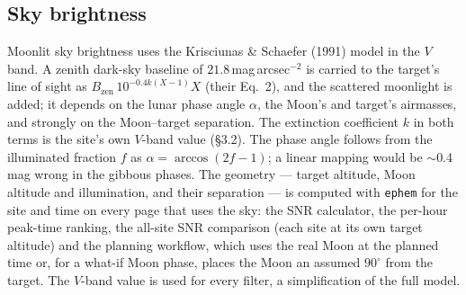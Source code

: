 \documentclass[11pt]{article}
\begin{document}
\subsection{Sky brightness}
\label{sec:sky}
Moonlit sky brightness uses the Krisciunas \& Schaefer (1991) model \cite{ks1991}
in the $V$ band. A zenith dark-sky baseline of $21.8$\,mag\,arcsec$^{-2}$ is carried
to the target's line of sight as $B_{\text{zen}}\,10^{-0.4k(X-1)}X$ (their Eq.~2),
and the scattered moonlight is added; it depends on the lunar phase angle $\alpha$,
the Moon's and target's airmasses, and strongly on the Moon--target separation.
The extinction coefficient $k$ in both terms is the site's own $V$-band value
(\S3.2). The phase angle follows from the illuminated fraction $f$ as
$\alpha=\arccos(2f-1)$; a linear mapping would be $\sim$0.4\,mag wrong in the gibbous
phases. The geometry --- target altitude, Moon altitude and illumination, and their
separation --- is computed with \texttt{ephem} for the site and time on every page
that uses the sky: the SNR calculator, the per-hour peak-time ranking, the all-site
SNR comparison (each site at its own target altitude) and the planning workflow,
which uses the real Moon at the planned time or, for a what-if Moon phase, places
the Moon an assumed $90^\circ$ from the target. The $V$-band value is used for every
filter, a simplification of the full model.
\end{document}
